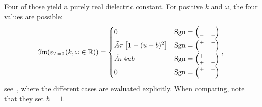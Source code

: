 \documentclass[physics,phd,nolot,nolof]{uccthesis}%
\newcommand{\Sgn}{\text{Sgn}}
\begin{document}
{Four of those yield a purely real dielectric constant.
For positive $k$ and $\omega$, the four values are possible: 
\begin{equation}
  \mathfrak{Im}( \varepsilon_{T=0}(k,\omega\in\mathbb{R}))=
  \begin{cases}
    0	&\Sgn=	\scriptsize{
    		\begin{pmatrix}
      			-&-\\
			-&-
		      \end{pmatrix}
		      }\\
 \tilde{A}\pi \left[ 1- (u-b)^2\right]
 	&\Sgn=	 \scriptsize{
\begin{pmatrix}
      			+&-\\
			-&-
		  \end{pmatrix}
		  }\\
 \tilde{A}\pi 4ub
	&\Sgn=	 \scriptsize{
\begin{pmatrix}
      			+&-\\
			+&-
		  \end{pmatrix}
		  }\\
    0	&\Sgn=	 \scriptsize{
\begin{pmatrix}
      			+&+\\
			-&-
		  \end{pmatrix}
		  }
  \end{cases},
  \label{eq:im_eps_lindhard_real_w++}
\end{equation}
see~\cite{mahanmany}, where the different cases are evaluated explicitly. 
When comparing, note that they set $\hbar=1$.
}
\end{document}

